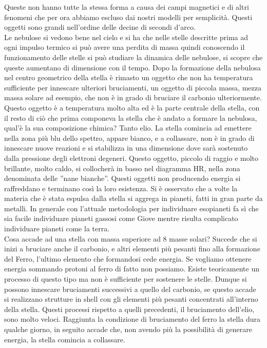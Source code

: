 \documentclass[a4paper,11pt]{article}
\begin{document}
    Queste non hanno tutte la stessa forma a causa dei campi magnetici e di altri fenomeni che per ora abbiamo escluso dai nostri modelli per semplicità. Questi oggetti sono grandi nell'ordine delle decine di secondi d'arco.\\
    Le nebulose si vedono bene nel cielo e si ha che nelle stelle descritte prima ad ogni impulso termico si può avere una perdita di massa quindi conoscendo il funzionamento delle stelle si può studiare la dinamica delle nebulose, si scopre che queste aumentano di dimensione con il tempo. Dopo la formazione della nebulosa nel centro geometrico della stella è rimasto un oggetto che non ha temperatura sufficiente per innescare ulteriori bruciamenti, un oggetto di piccola massa, mezza massa solare ad esempio, che non è in grado di bruciare il carbonio ulteriormente. Questo oggetto è a temperatura molto alta ed è la parte centrale della stella, con il resto di ciò che prima componeva la stella che è andato a formare la nebulosa, qual'è la sua composizione chimica? Tanto elio. La stella comincia ad emettere nella zona più blu dello spettro, appare bianco, e a collassare, non è in grado di innescare nuove reazioni e si stabilizza in una dimensione dove sarà sostenuto dalla pressione degli elettroni degeneri. Questo oggetto, piccolo di raggio e molto brillante, molto caldo, si collocherà in basso nel diagramma HR, nella zona denominata delle ''nane bianche''. Questi oggetti non producendo energia si raffreddano e terminano così la loro esistenza. Si è osservato che a volte la materia che è stata espulsa dalla stella si aggrega in pianeti, fatti in gran parte da metalli. In generale con l'attuale metodologia per individuare esopianeti fa sì che sia facile individuare pianeti gassosi come Giove mentre risulta complicato individuare pianeti come la terra.\\
    Cosa accade ad una stella con massa superiore ad 8 masse solari? Succede che si inizi a bruciare anche il carbonio, e altri elementi più pesanti fino alla formazione del Ferro, l'ultimo elemento che formandosi cede energia. Se vogliamo ottenere energia sommando protoni al ferro di fatto non possiamo. Esiste teoricamente un processo di questo tipo ma non è sufficiente per sostenere le stelle. Dunque si possono innescare bruciamenti successivi a quello del carbonio, se questo accade si realizzano strutture in shell con gli elementi più pesanti concentrati all'interno della stella. Questi processi rispetto a quelli precedenti, il bruciamento dell'elio, sono molto veloci. Raggiunta la condizione di bruciamento del ferro la stella dura qualche giorno, in seguito accade che, non avendo più la possibilità di generare energia, la stella comincia a collassare.
    
\end{document}
